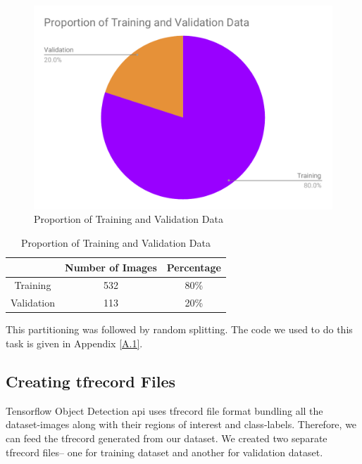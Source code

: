             \begin{figure}
                \centering
                \includegraphics[width=\textwidth]{images/Proportion of Training and Validation Data.pdf}
                \caption{Proportion of Training and Validation Data}
                \label{fig:train_test_proportion}
            \end{figure}
        
            \begin{table}
                \centering
                \begin{tabular}{|c|c|c|} \hline
                     &  Number of Images & Percentage \\\hline\hline
                    Training & 532 & 80\% \\\hline
                    Validation & 113 & 20\% \\\hline
                \end{tabular}
                \caption{Proportion of Training and Validation Data}
                \label{tab:train_test_proportion}
            \end{table}
            
            This partitioning was followed by random splitting. The code we used to do this task is given in Appendix \ref{A.1}.
            
        \subsection{Creating tfrecord Files}
            Tensorflow Object Detection \acrshort{api} uses \gls{tfrecord} file format bundling all the dataset-images along with their regions of interest and class-labels. Therefore, we can feed the tfrecord generated from our dataset. We created two separate tfrecord files-- one for training dataset and another for validation dataset.
            
